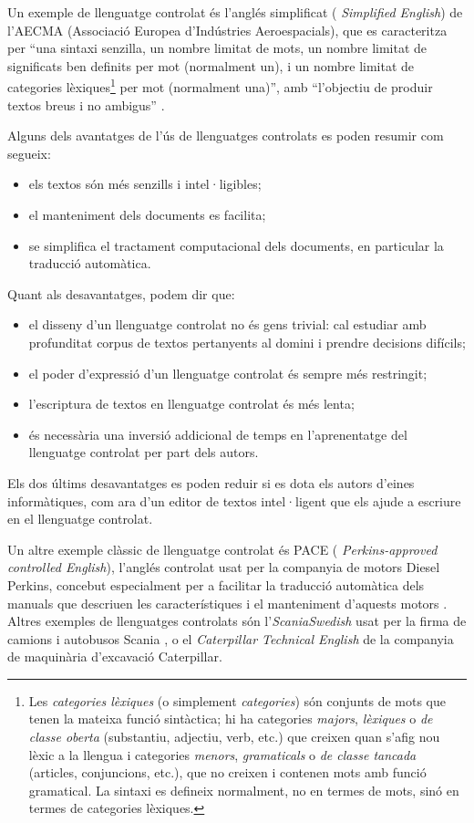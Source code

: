Un exemple de llenguatge controlat és l'anglés simplificat ({\em
  Simplified English}) de l'AECMA (Associació Europea d'Indústries
Aeroespacials), que es caracteritza per ``una sintaxi senzilla, un
nombre limitat de mots, un nombre limitat de significats ben definits
per mot (normalment un), i un nombre limitat de categories
lèxiques\footnote{Les \emph{categories lèxiques} (o simplement {\em
    categories}) són conjunts de mots que tenen la mateixa funció
  sintàctica; hi ha categories \emph{majors}, \emph{lèxiques} o \emph{de
    classe oberta} (substantiu, adjectiu, verb, etc.) que creixen
  quan s'afig nou lèxic a la llengua i categories \emph{menors}, {\em
    gramaticals} o \emph{de classe tancada} (articles, conjuncions,
  etc.), que no creixen i contenen mots amb funció gramatical. La
  sintaxi es defineix normalment, no en termes de mots, sinó en termes
  de categories lèxiques.}\label{pg:catgra} per mot (normalment
una)'', amb ``l'objectiu de produir textos breus i no ambigus''
\citep{AECMA07u}.


Alguns dels avantatges de l'ús de llenguatges controlats \citep{schwitten07u} es poden
resumir com segueix:
\begin{itemize}
\item els textos són més senzills i intel·ligibles;
\item el manteniment dels documents es facilita;
\item se simplifica el tractament computacional dels documents,  en
particular la traducció automàtica.
\end{itemize} 
Quant als desavantatges, podem dir que:
\begin{itemize}
\item 
    el disseny d'un llenguatge controlat no és gens trivial: cal
    estudiar amb profunditat corpus de textos pertanyents al domini i
    prendre decisions difícils;
\item el poder d'expressió d'un llenguatge controlat és sempre
més restringit;
\item l'escriptura de textos en llenguatge controlat és més lenta;
\item és necessària una inversió addicional de temps en
l'aprenentatge del llenguatge controlat per part dels autors.  
\end{itemize}  
Els dos últims desavantatges es poden reduir si es dota els autors
d'eines informàtiques, com ara d'un
editor de textos intel·ligent que els ajude a escriure en el llenguatge
controlat.

Un altre exemple clàssic de llenguatge controlat és PACE ({\em
  Perkins-approved controlled English}), l'anglés controlat usat per
la companyia de motors Diesel Perkins, concebut especialment per a
facilitar la traducció automàtica dels manuals que descriuen les
característiques i el manteniment d'aquests motors \citep{newton92b}.
Altres exemples de llenguatges controlats són l'\emph{ScaniaSwedish}
usat per la firma de camions i autobusos Scania \citep{almqvist96p}, o el {\em
  Caterpillar Technical English} de la companyia de maquinària
d'excavació Caterpillar.

